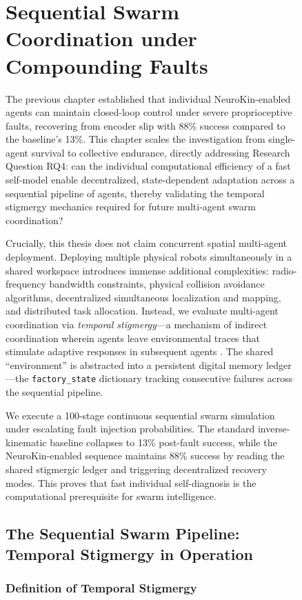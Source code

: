 \documentclass[12pt,a4paper,oneside]{report}
\begin{document}
\begin{figure}[H]
\chapter{Sequential Swarm Coordination under Compounding Faults}
\label{chap:sequential_swarm_coordination_ch6}

The previous chapter established that individual NeuroKin-enabled agents can maintain closed-loop control under severe proprioceptive faults, recovering from encoder slip with 88\% success compared to the baseline's 13\%. This chapter scales the investigation from single-agent survival to collective endurance, directly addressing Research Question RQ4: can the individual computational efficiency of a fast self-model enable decentralized, state-dependent adaptation across a sequential pipeline of agents, thereby validating the temporal stigmergy mechanics required for future multi-agent swarm coordination?

Crucially, this thesis does not claim concurrent spatial multi-agent deployment. Deploying multiple physical robots simultaneously in a shared workspace introduces immense additional complexities: radio-frequency bandwidth constraints, physical collision avoidance algorithms, decentralized simultaneous localization and mapping, and distributed task allocation. Instead, we evaluate multi-agent coordination via \textit{temporal stigmergy}---a mechanism of indirect coordination wherein agents leave environmental traces that stimulate adaptive responses in subsequent agents \cite{bongard2006resilient}. The shared ``environment'' is abstracted into a persistent digital memory ledger---the \texttt{factory\_state} dictionary tracking consecutive failures across the sequential pipeline.

We execute a 100-stage continuous sequential swarm simulation under escalating fault injection probabilities. The standard inverse-kinematic baseline collapses to 13\% post-fault success, while the NeuroKin-enabled sequence maintains 88\% success by reading the shared stigmergic ledger and triggering decentralized recovery modes. This proves that fast individual self-diagnosis is the computational prerequisite for swarm intelligence.

\section{The Sequential Swarm Pipeline: Temporal Stigmergy in Operation}

\subsection{Definition of Temporal Stigmergy}


\end{figure}
\end{document}
